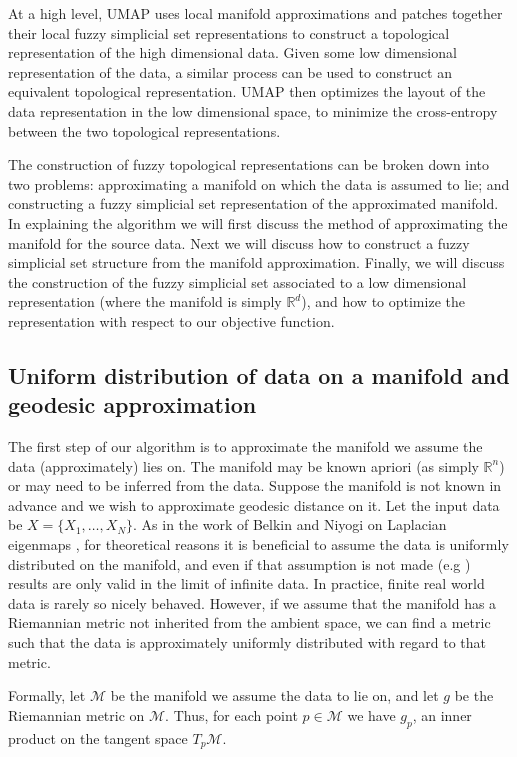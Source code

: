 \documentclass[12pt]{article}
\begin{document}
At a high level, UMAP uses local manifold approximations and patches together their local fuzzy simplicial set representations to construct a topological representation of the high dimensional data. Given some low dimensional representation of the data, a similar process can be used to construct an equivalent topological representation. UMAP then optimizes the layout of the data representation in the low dimensional space, to minimize the cross-entropy between the two topological representations.

The construction of fuzzy topological representations can be broken down into two problems: approximating a manifold on which the data is assumed to lie; and constructing a fuzzy simplicial set representation of the approximated manifold. In explaining the algorithm we will first discuss the method of approximating the manifold for the source data. Next we will discuss how to construct a fuzzy simplicial set structure from the manifold approximation. Finally, we will discuss the construction of the fuzzy simplicial set associated to a low dimensional representation (where the manifold is simply $\mathbb{R}^d$), and how to optimize the representation with respect to our objective function.

\subsection{Uniform distribution of data on a manifold and geodesic approximation}\label{graph_derivation}

The first step of our algorithm is to approximate the manifold we assume the data (approximately) lies on. The manifold may be known apriori (as simply $\mathbb{R}^n$) or may need to be inferred from the data. Suppose the manifold is not known in advance and we wish to approximate geodesic distance on it. Let the input data be $X = \{X_1, \ldots, X_N\}$. As in the work of Belkin and Niyogi on Laplacian eigenmaps \cite{belkin2002laplacian,belkin2003laplacian}, for theoretical reasons it is beneficial to assume the data is uniformly distributed on the manifold, and even if that assumption is not made (e.g \cite{hein2007graph}) results are only valid in the limit of infinite data. In practice, finite real world data is rarely so nicely behaved. However, if we assume that the manifold has a Riemannian metric not inherited from the ambient space, we can find a metric such that the data is approximately uniformly distributed with regard to that metric.

Formally, let $\mathcal{M}$ be the manifold we assume the data to lie on, and let $g$ be the Riemannian metric on $\mathcal{M}$. Thus, for each point $p\in \mathcal{M}$ we have $g_p$, an inner product on the tangent space $T_p\mathcal{M}$.
\end{document}
